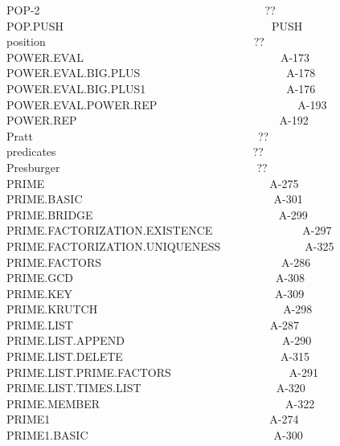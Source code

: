 \documentclass[11pt]{book}
\newenvironment{pubasis}{\begin{flushleft}\ttfamily\small}{\normalsize\rmfamily\end{flushleft}}
\begin{document}
\begin{pubasis}
POP-2~~~~~~~~~~~~~~~~~~~~~~~~~~~~~~~~~~~~~~~~??\\
POP.PUSH~~~~~~~~~~~~~~~~~~~~~~~~~~~~~~~~~~~~~PUSH\\
position~~~~~~~~~~~~~~~~~~~~~~~~~~~~~~~~~~~~~??\\
POWER.EVAL~~~~~~~~~~~~~~~~~~~~~~~~~~~~~~~~~~~A-173\\
POWER.EVAL.BIG.PLUS~~~~~~~~~~~~~~~~~~~~~~~~~~A-178\\
POWER.EVAL.BIG.PLUS1~~~~~~~~~~~~~~~~~~~~~~~~~A-176\\
POWER.EVAL.POWER.REP~~~~~~~~~~~~~~~~~~~~~~~~~A-193\\
POWER.REP~~~~~~~~~~~~~~~~~~~~~~~~~~~~~~~~~~~~A-192\\
Pratt~~~~~~~~~~~~~~~~~~~~~~~~~~~~~~~~~~~~~~~~??\\
predicates~~~~~~~~~~~~~~~~~~~~~~~~~~~~~~~~~~~??\\
Presburger~~~~~~~~~~~~~~~~~~~~~~~~~~~~~~~~~~~??\\
PRIME~~~~~~~~~~~~~~~~~~~~~~~~~~~~~~~~~~~~~~~~A-275\\
PRIME.BASIC~~~~~~~~~~~~~~~~~~~~~~~~~~~~~~~~~~A-301\\
PRIME.BRIDGE~~~~~~~~~~~~~~~~~~~~~~~~~~~~~~~~~A-299\\
PRIME.FAC\-TOR\-I\-ZA\-TION.EXISTENCE~~~~~~~~~~~~~~~~A-297\\
PRIME.FAC\-TOR\-I\-ZA\-TION.UNIQUENESS~~~~~~~~~~~~~~~A-325\\
PRIME.FAC\-TORS~~~~~~~~~~~~~~~~~~~~~~~~~~~~~~~~A-286\\
PRIME.GCD~~~~~~~~~~~~~~~~~~~~~~~~~~~~~~~~~~~~A-308\\
PRIME.KEY~~~~~~~~~~~~~~~~~~~~~~~~~~~~~~~~~~~~A-309\\
PRIME.KRUTCH~~~~~~~~~~~~~~~~~~~~~~~~~~~~~~~~~A-298\\
PRIME.LIST~~~~~~~~~~~~~~~~~~~~~~~~~~~~~~~~~~~A-287\\
PRIME.LIST.APPEND~~~~~~~~~~~~~~~~~~~~~~~~~~~~A-290\\
PRIME.LIST.DELETE~~~~~~~~~~~~~~~~~~~~~~~~~~~~A-315\\
PRIME.LIST.PRIME.FAC\-TORS~~~~~~~~~~~~~~~~~~~~~A-291\\
PRIME.LIST.TIMES.LIST~~~~~~~~~~~~~~~~~~~~~~~~A-320\\
PRIME.MEMBER~~~~~~~~~~~~~~~~~~~~~~~~~~~~~~~~~A-322\\
PRIME1~~~~~~~~~~~~~~~~~~~~~~~~~~~~~~~~~~~~~~~A-274\\
PRIME1.BASIC~~~~~~~~~~~~~~~~~~~~~~~~~~~~~~~~~A-300\\

\end{pubasis}
\end{document}
